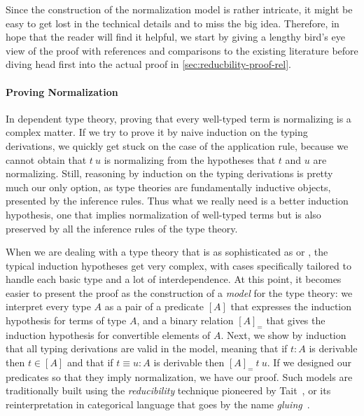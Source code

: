 Since the construction of the normalization model is rather intricate, it might
be easy to get lost in the technical details and to miss the big idea. 
% 
Therefore, in hope that the reader will find it helpful, we start by giving a lengthy 
bird's eye view of the proof with references and comparisons to the existing
literature before diving head first into the actual proof in 
\cref{sec:reducbility-proof-rel}.

\paragraph*{Proving Normalization}

In dependent type theory, proving that every well-typed term is normalizing 
is a complex matter.
% 
If we try to prove it by naive induction on the typing derivations, we quickly 
get stuck on the case of the application rule, because we cannot obtain that 
\( t~u \) is normalizing from the hypotheses that $t$ and $u$ are normalizing.
%
Still, reasoning by induction on the typing derivations is pretty much our only 
option, as type theories are fundamentally inductive objects, presented by 
the inference rules.
% 
Thus what we really need is a better induction hypothesis, one that implies
normalization of well-typed terms but is also preserved by all the inference 
rules of the type theory.

When we are dealing with a type theory that is as sophisticated as \MLTT or \SetoidCC, 
the typical induction hypotheses get very complex, with cases specifically 
tailored to handle each basic type and a lot of interdependence.
% 
At this point, it becomes easier to present the proof as the construction of
a \emph{model} for the type theory: we interpret every type \( A \) as a pair 
of a predicate \( [A] \) that expresses the induction hypothesis for terms of 
type \( A \), and a binary relation \( [A]_= \) that gives the induction 
hypothesis for convertible elements of \( A \).
% 
% 
Next, we show by induction that all typing derivations are valid in the model,
meaning that if \( t : A \) is derivable then \( t \in [A] \) and that if
\( t \equiv u : A \) is derivable then \( [A]_=\ t\ u \).
% 
If we designed our predicates so that they imply normalization, we have our 
proof.
% 
Such models are traditionally built using the \emph{reducibility} technique
pioneered by Tait~, or its reinterpretation in categorical language
that goes by the name \emph{gluing}~.

